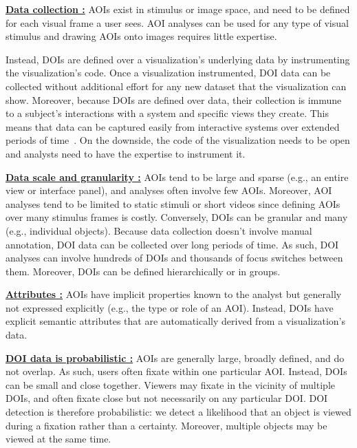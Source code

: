 \textbf{\underline{Data collection :}} AOIs exist in stimulus or image space, and need to be defined for each visual frame a user sees. AOI analyses can be used for any type of visual stimulus and drawing AOIs onto images requires little expertise. 

Instead, DOIs are defined over a visualization's underlying data by instrumenting the visualization's code. Once a visualization instrumented, DOI data can be collected without additional effort for any new dataset that the visualization can show. Moreover, because DOIs are defined over data, their collection is immune to a subject's interactions with a system and specific views they create. This means that data can be captured easily from interactive systems over extended periods of time~\cite{alam15analyzing}. On the downside, the code of the visualization needs to be open and analysts need to have the expertise to instrument it.

\textbf{\underline{Data scale and granularity :}} AOIs tend to be large and sparse (e.g., an entire view or interface panel), and analyses often involve few AOIs. Moreover, AOI analyses tend to be limited to static stimuli or short videos since defining AOIs over many stimulus frames is costly. Conversely, DOIs can be granular and many (e.g., individual objects). Because data collection doesn't involve manual annotation, DOI data can be collected over long periods of time. As such, DOI analyses can involve hundreds of DOIs and thousands of focus switches between them. Moreover, DOIs can be defined hierarchically or in groups. 

\textbf{\uline{Attributes :}} AOIs have implicit properties known to the analyst but generally not expressed explicitly (e.g., the type or role of an AOI). Instead, DOIs have explicit semantic attributes that are automatically derived from a visualization's data. 

\textbf{\underline{DOI data is probabilistic :}} AOIs are generally large, broadly defined, and do not overlap. As such, users often fixate within one particular AOI. Instead, DOIs can be small and close together. Viewers may fixate in the vicinity of multiple DOIs, and often fixate close but not necessarily on any particular DOI. DOI detection is therefore probabilistic: we detect a likelihood that an object is viewed during a fixation rather than a certainty. Moreover, multiple objects may be viewed at the same time.

